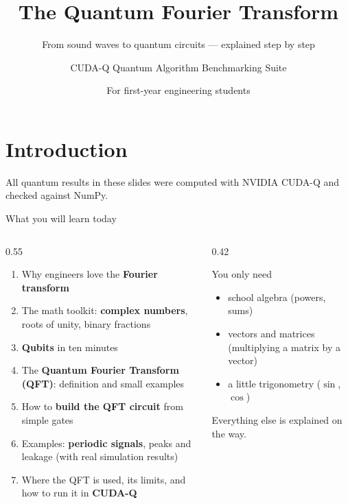 \documentclass[aspectratio=169,11pt]{beamer}
\title{The Quantum Fourier Transform}
\subtitle{From sound waves to quantum circuits --- explained step by step}
\author{CUDA-Q Quantum Algorithm Benchmarking Suite}
\date{For first-year engineering students}
\newcommand{\key}[1]{{\color{qdark}\textbf{#1}}}
\begin{document}
\section{Introduction}
\begin{frame}
  \titlepage
  \centering\small\color{qgrey}
  All quantum results in these slides were computed with NVIDIA CUDA-Q and checked against NumPy.
\end{frame}

\begin{frame}{What you will learn today}
  \begin{columns}[T]
    \begin{column}{0.55\textwidth}
      \begin{enumerate}
        \item Why engineers love the \key{Fourier transform}
        \item The math toolkit: \key{complex numbers}, roots of unity, binary fractions
        \item \key{Qubits} in ten minutes
        \item The \key{Quantum Fourier Transform (QFT)}: definition and small examples
        \item How to \key{build the QFT circuit} from simple gates
        \item Examples: \key{periodic signals}, peaks and leakage (with real simulation results)
        \item Where the QFT is used, its limits, and how to run it in \key{CUDA-Q}
      \end{enumerate}
    \end{column}
    \begin{column}{0.42\textwidth}
      \begin{block}{You only need}
        \begin{itemize}
          \item school algebra (powers, sums)
          \item vectors and matrices (multiplying a matrix by a vector)
          \item a little trigonometry ($\sin$, $\cos$)
        \end{itemize}
        Everything else is explained on the way.
      \end{block}
    \end{column}
  \end{columns}
\end{frame}
\end{document}
